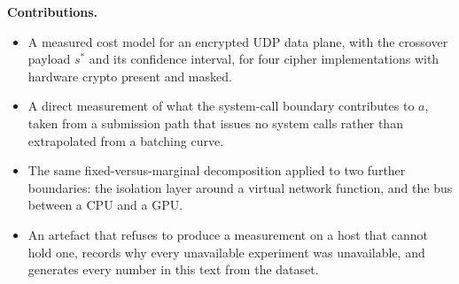 \noindent\textbf{Contributions.}
\begin{itemize}
  \item A measured cost model for an encrypted UDP data plane, with the
        crossover payload $s^{*}$ and its confidence interval, for four cipher
        implementations with hardware crypto present and masked.
  \item A direct measurement of what the system-call boundary contributes to
        $a$, taken from a submission path that issues no system calls
        \cite{iouring} rather than extrapolated from a batching curve.
  \item The same fixed-versus-marginal decomposition applied to two further
        boundaries: the isolation layer around a virtual network function, and
        the bus between a CPU and a GPU.
  \item An artefact that refuses to produce a measurement on a host that cannot
        hold one, records why every unavailable experiment was unavailable, and
        generates every number in this text from the dataset.
\end{itemize}
